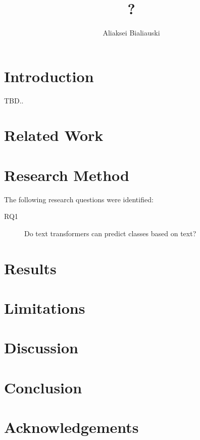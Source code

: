 \documentclass[sigplan,nonacm,review]{acmart}
\title{?}
\author{Aliaksei Bialiauski}
\affiliation{
    \institution{?}
    \city{Minsk}
    \country{Belarus}
}
\begin{document}
    \maketitle


    \section{Introduction}\label{sec:introduction}
    TBD..


    \section{Related Work}\label{sec:related}


    \section{Research Method}\label{sec:method}
    The following research questions were identified:
    \begin{description}
        \item[RQ1] Do text transformers can predict classes based on text?
    \end{description}


    \section{Results}\label{sec:results}


    \section{Limitations}\label{sec:limitations}


    \section{Discussion}\label{sec:discussion}


    \section{Conclusion}\label{sec:conclusion}


    \section{Acknowledgements}\label{sec:acks}

    
    \cite{testCitation}
    
\end{document}
